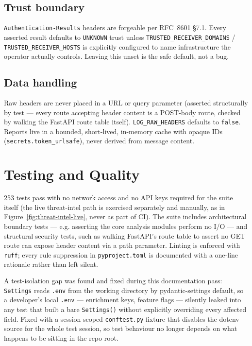 \documentclass[11pt,a4paper]{article}
\begin{document}
\subsection{Trust boundary}
\texttt{Authentication-Results} headers are forgeable per RFC~8601 \S7.1. Every asserted
result defaults to \texttt{UNKNOWN} trust unless \texttt{TRUSTED\_RECEIVER\_DOMAINS} /
\texttt{TRUSTED\_RECEIVER\_HOSTS} is explicitly configured to name infrastructure the operator
actually controls. Leaving this unset is the safe default, not a bug.

\subsection{Data handling}
Raw headers are never placed in a URL or query parameter (asserted structurally by test —
every route accepting header content is a POST-body route, checked by walking the FastAPI
route table itself). \texttt{LOG\_RAW\_HEADERS} defaults to \texttt{false}. Reports live in a
bounded, short-lived, in-memory cache with opaque IDs (\texttt{secrets.token\_urlsafe}), never
derived from message content.

\section{Testing and Quality}

253 tests pass with no network access and no API keys required for the suite itself (the live
threat-intel path is exercised separately and manually, as in Figure~\ref{fig:threat-intel-live},
never as part of CI). The suite includes architectural boundary tests — e.g. asserting the
core analysis modules perform no I/O — and structural security tests, such as walking
FastAPI's route table to assert no GET route can expose header content via a path parameter.
Linting is enforced with \texttt{ruff}; every rule suppression in \texttt{pyproject.toml} is
documented with a one-line rationale rather than left silent.

A test-isolation gap was found and fixed during this documentation pass: \texttt{Settings}
reads \texttt{.env} from the working directory by pydantic-settings default, so a developer's
local \texttt{.env} — enrichment keys, feature flags — silently leaked into any test that
built a bare \texttt{Settings()} without explicitly overriding every affected field. Fixed with
a session-scoped \texttt{conftest.py} fixture that disables the dotenv source for the whole
test session, so test behaviour no longer depends on what happens to be sitting in the repo
root.
\end{document}
